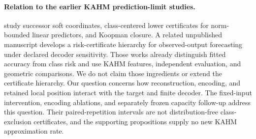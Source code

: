 \paragraph{Relation to the earlier KAHM prediction-limit studies.}
\citet{KumarKargaran2026Limits} study successor soft coordinates, class-centered
lower certificates for norm-bounded linear predictors, and Koopman closure.
A related unpublished manuscript \citep{Anonymous2026Certificates}
develops a risk-certificate hierarchy for observed-output forecasting under
declared decoder sensitivity. Those works already distinguish fitted
accuracy from class risk and use KAHM features, independent evaluation,
and geometric comparisons. We do not claim those ingredients or extend
the certificate hierarchy. Our question concerns how reconstruction,
encoding, and retained local position interact with the target and finite
decoder. The fixed-input intervention, encoding ablations, and separately
frozen capacity follow-up address this question. Their paired-repetition
intervals are not distribution-free class-exclusion certificates, and the
supporting propositions supply no new KAHM approximation rate.
